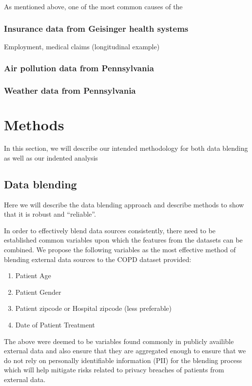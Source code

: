 \documentclass{article}
\begin{document}
As mentioned above, one of the most common causes of the


\subsubsection{Insurance data from Geisinger health systems}
Employment, medical claims (longitudinal example)


\subsubsection{Air pollution data from Pennsylvania}


\subsubsection{Weather data from Pennsylvania}


\section{Methods}

In this section, we will describe our intended methodology for both data 
blending as well as our indented analysis

\subsection{Data blending}

\noindent Here we will describe the data blending approach and describe methods 
to show that it is robust and ``reliable''.

\nonindent In order to effectively blend data sources consistently, there need 
to be established common variables upon which the features from the datasets
can be combined. We propose the following variables as the most effective 
method of blending external data sources to the COPD dataset provided:

\begin{enumerate}
\item Patient Age
\item Patient Gender
\item Patient zipcode or Hospital zipcode (less preferable)
\item Date of Patient Treatment
\end{enumerate}

\noindent The above were deemed to be variables found commonly in publicly availible 
external data and also ensure that they are aggregated enough to ensure that we
do not rely on personally identifiable information (PII) for the blending process
which will help mitigate risks related to privacy breaches of patients from 
external data.
\end{document}
